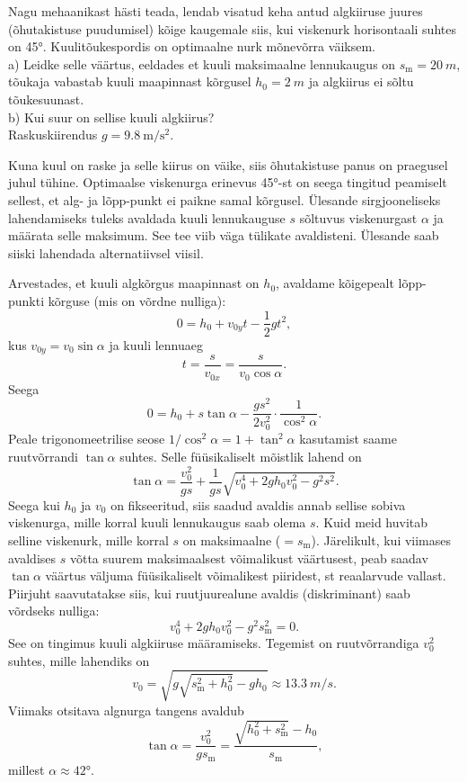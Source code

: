 
Nagu mehaanikast hästi teada, lendab visatud keha antud algkiiruse juures (õhutakistuse puudumisel) kõige kaugemale siis, kui viskenurk horisontaali suhtes on \ang{45}. Kuulitõukespordis on optimaalne nurk mõnevõrra väiksem.
\\a) Leidke selle väärtus, eeldades et kuuli maksimaalne lennukaugus on $s_\text{m}=\SI{20}{m}$, tõukaja vabastab kuuli maapinnast kõrgusel $h_0=\SI{2}{m}$ ja algkiirus ei sõltu tõukesuunast.
\\b) Kui suur on sellise kuuli algkiirus?
\\Raskuskiirendus $g=\SI{9.8}{\meter\per\second\squared}$.


\hint

\solu
\par

Kuna kuul on raske ja selle kiirus on väike, siis õhutakistuse panus on praegusel juhul tühine. Optimaalse viskenurga erinevus \ang{45}-st on seega tingitud peamiselt sellest, et alg- ja lõpp-punkt ei paikne samal kõrgusel. Ülesande sirgjooneliseks lahendamiseks tuleks avaldada kuuli lennukauguse $s$ sõltuvus viskenurgast $\alpha$ ja määrata selle maksimum. See tee viib väga tülikate avaldisteni. Ülesande saab siiski lahendada alternatiivsel viisil.

Arvestades, et kuuli algkõrgus maapinnast on $h_0$, avaldame kõigepealt lõpp-punkti kõrguse (mis on võrdne nulliga):
\[
0=h_0+v_{0y}t-\frac{1}{2}gt^2,
\]
kus $v_{0y}=v_0\sin\alpha$ ja kuuli lennuaeg
\[
t=\frac{s}{v_{0x}}=\frac{s}{v_0\cos\alpha}.
\]
Seega
\[
0=h_0+s\tan\alpha-\frac{gs^2}{2v_0^2}\cdot\frac{1}{\cos^2\alpha}.
\]
Peale trigonomeetrilise seose $1/\cos^2\alpha=1+\tan^2\alpha$ kasutamist saame ruutvõrrandi $\tan\alpha$ suhtes. Selle füüsikaliselt mõistlik lahend on
\[
\tan\alpha=\frac{v_0^2}{gs}+\frac{1}{gs}\sqrt{v_0^4+2gh_0v_0^2-g^2s^2}.
\]
Seega kui $h_0$ ja $v_0$ on fikseeritud, siis saadud avaldis annab sellise sobiva viskenurga, mille korral kuuli lennukaugus saab olema $s$. Kuid meid huvitab selline viskenurk, mille korral $s$ on maksimaalne ($=s_\text{m}$). Järelikult, kui viimases avaldises $s$ võtta suurem maksimaalsest võimalikust väärtusest, peab saadav $\tan\alpha$ väärtus väljuma füüsikaliselt võimalikest piiridest, st reaalarvude vallast. Piirjuht saavutatakse siis, kui ruutjuurealune avaldis (diskriminant) saab võrdseks nulliga:
\[
v_0^4+2gh_0v_0^2-g^2s_\text{m}^2=0.
\]
See on tingimus kuuli algkiiruse määramiseks. Tegemist on ruutvõrrandiga $v_0^2$ suhtes, mille lahendiks on
\[
v_0=\sqrt{g\sqrt{s_\text{m}^2+h_0^2}-gh_0}\approx \SI{13.3}{m/s}.
\]
Viimaks otsitava algnurga tangens avaldub
\[
\tan\alpha=\frac{v_0^2}{gs_\text{m}}=\frac{\sqrt{h_0^2+s_\text{m}^2}-h_0}{s_\text{m}},
\]
millest $\alpha\approx\ang{42}$.
\probend